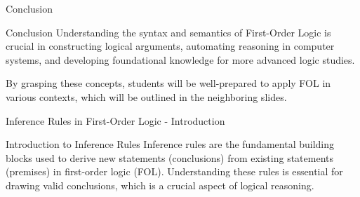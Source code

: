 \documentclass[aspectratio=169]{beamer}
\begin{document}
\begin{frame}[fragile]{Conclusion}
    \begin{block}{Conclusion}
        Understanding the syntax and semantics of First-Order Logic is crucial in constructing logical arguments, automating reasoning in computer systems, and developing foundational knowledge for more advanced logic studies.
        
        By grasping these concepts, students will be well-prepared to apply FOL in various contexts, which will be outlined in the neighboring slides.
    \end{block}
\end{frame}

\begin{frame}[fragile]{Inference Rules in First-Order Logic - Introduction}
    \begin{block}{Introduction to Inference Rules}
        Inference rules are the fundamental building blocks used to derive new statements (conclusions) from existing statements (premises) in first-order logic (FOL). Understanding these rules is essential for drawing valid conclusions, which is a crucial aspect of logical reasoning.
    \end{block}
\end{frame}
\end{document}
